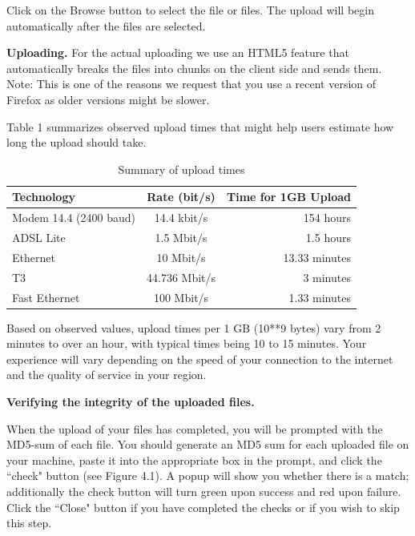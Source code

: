 \documentclass[12pt,fullpage]{report}
\begin{document}
Click on the Browse button to select the file or files.  The upload will begin automatically after the files are selected.

\noindent
{\bf Uploading.}
For the actual uploading we use an HTML5 feature \cite{HTML5FILEAPI} that automatically breaks the files into chunks on the client side and sends them. Note: This is one of the reasons we request that you use a recent version of Firefox as older versions might be slower.

Table 1 summarizes observed upload times that might help users estimate how long the upload should take.

\begin{table}
\begin{center}
\caption{Summary of upload times}
\begin{tabular}{ l | c | r }
Technology & Rate (bit/s) & Time for 1GB Upload\\
  \hline
Modem 14.4 (2400 baud) &	14.4 kbit/s&	154 hours\\
ADSL Lite & 1.5 Mbit/s &	1.5 hours\\
Ethernet&	10 Mbit/s & 13.33 minutes\\
T3 &	44.736 Mbit/s &~3 minutes\\
Fast Ethernet &	100 Mbit/s &1.33 minutes\\
  \hline
\end{tabular}
\end{center}
\end{table}


Based on observed values, upload times per 1 GB (10**9 bytes) vary from 2 minutes to over an hour, with typical times being 10 to 15 minutes. Your experience will vary depending on the speed of your connection to the internet and the quality of service in your region.




\noindent
{\bf Verifying the integrity of the uploaded files.}

When the upload of your files has completed, you will be prompted with the \gls{MD5}-sum of each file. You should generate an MD5 sum for each uploaded file on your machine, paste it into the appropriate box in the prompt, and click the ``check" button (see Figure 4.1). A popup will show you whether there is a match; additionally the check button will turn green upon success and red upon failure. Click the ``Close" button if you have completed the checks or if you wish to skip this step.
\end{document}

